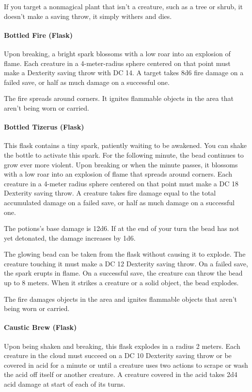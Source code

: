         If you target a nonmagical plant that isn't a creature, such as a tree or shrub, it doesn't make a saving throw, it simply withers and dies.
    \paragraph{Bottled Fire (Flask)} %
        Upon breaking, a bright spark blossoms with a low roar into an explosion of flame.
        Each creature in a 4-meter-radius sphere centered on that point must make a Dexterity saving throw with DC 14.
        A target takes 8d6 fire damage on a failed save, or half as much damage on a successful one.

        The fire spreads around corners.
        It ignites flammable objects in the area that aren't being worn or carried.
    \paragraph{Bottled Tizerus (Flask)} %
        This flask contains a tiny spark, patiently waiting to be awakened.
        You can shake the bottle to activate this spark.
        For the following minute, the bead continues to grow ever more violent.
        Upon breaking or when the minute passes, it blossoms with a low roar into an explosion of flame that spreads around corners.
        Each creature in a 4-meter radius sphere centered on that point must make a DC 18 Dexterity saving throw.
        A creature takes fire damage equal to the total accumulated damage on a failed save, or half as much damage on a successful one.

        The potions's base damage is 12d6.
        If at the end of your turn the bead has not yet detonated, the damage increases by 1d6.

        The glowing bead can be taken from the flask without causing it to explode.
        The creature touching it must make a DC 12 Dexterity saving throw.
        On a failed save, the spark erupts in flame.
        On a successful save, the creature can throw the bead up to 8 meters.
        When it strikes a creature or a solid object, the bead explodes.

        The fire damages objects in the area and ignites flammable objects that aren't being worn or carried.
    \paragraph{Caustic Brew (Flask)} %
        Upon being shaken and breaking, this flask explodes in a radius 2 meters.
        Each creature in the cloud must succeed on a DC 10 Dexterity saving throw or be covered in acid for a minute or until a creature uses two actions to scrape or wash the acid off itself or another creature.
        A creature covered in the acid takes 2d4 acid damage at start of each of its turns.
